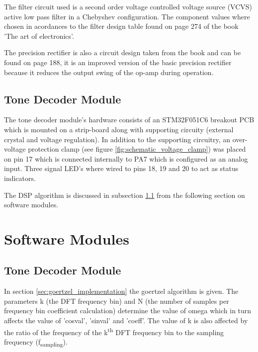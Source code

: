 The filter circuit used is a second order voltage controlled voltage source (VCVS) active low pass filter in a Chebyshev configuration. The component values where chosen in acordances to the filter design table found on page 274 of the book 'The art of electronics'\cite{Horowitz1995}.

The precision rectifier is also a circuit design taken from the book and can be found on page 188, it is an improved version of the basic precision rectifier because it reduces the output swing of the op-amp during operation\cite{Horowitz1995}.

\subsection{Tone Decoder Module}

The tone decoder module's hardware consists of an STM32F051C6 breakout PCB which is mounted on a strip-board along with supporting circuity (external crystal and voltage regulation). In addition to the supporting circuitry, an over-voltage protection clamp (see figure \ref{fig:schematic_voltage_clamp}) was placed on pin 17 which is connected internally to PA7 which is configured as an analog input. Three signal LED's where wired to pins 18, 19 and 20 to act as status indicators.

The DSP algorithm is discussed in subsection \ref{tone_decoder_software} from the following section on software modules.






\section{Software Modules}

\subsection{Tone Decoder Module}
\label{tone_decoder_software}

In section \ref{sec:goertzel_implementation} the goertzel algorithm is given. The parameters k (the DFT frequency bin) and N (the number of samples per frequency bin coefficient calculation) determine the value of omega which in turn affects the value of 'cosval', 'sinval' and 'coeff'. The value of k is also affected by the ratio of the frequency of the k\textsuperscript{th} DFT frequency bin to the sampling frequency (f\textsubscript{sampling}).

